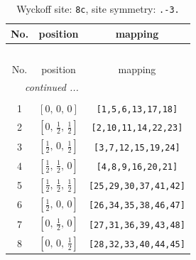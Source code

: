 \documentclass[fleqn,8pt]{jsarticle}
\begin{document}
\begin{longtable}{ccc}
\caption{Wyckoff site: {\tt 8c}, site symmetry: {\tt .-3.}}
 \\
 \hline \hline
No. & position & mapping \\ \hline \endfirsthead

\multicolumn{2}{l}{\tablename\ \thetable{}} \\
 \hline \hline
No. & position & mapping \\ \hline \endhead

 \hline \hline
\multicolumn{2}{r}{\footnotesize\it continued ...} \\ \endfoot

 \hline \hline
\multicolumn{2}{r}{} \\ \endlastfoot

1 & $\left[ 0,\, 0,\, 0 \right]$ & {\tt [1,5,6,13,17,18]} \\ \hline
2 & $\left[ 0,\, \frac{1}{2},\, \frac{1}{2} \right]$ & {\tt [2,10,11,14,22,23]} \\ \hline
3 & $\left[ \frac{1}{2},\, 0,\, \frac{1}{2} \right]$ & {\tt [3,7,12,15,19,24]} \\ \hline
4 & $\left[ \frac{1}{2},\, \frac{1}{2},\, 0 \right]$ & {\tt [4,8,9,16,20,21]} \\ \hline
5 & $\left[ \frac{1}{2},\, \frac{1}{2},\, \frac{1}{2} \right]$ & {\tt [25,29,30,37,41,42]} \\ \hline
6 & $\left[ \frac{1}{2},\, 0,\, 0 \right]$ & {\tt [26,34,35,38,46,47]} \\ \hline
7 & $\left[ 0,\, \frac{1}{2},\, 0 \right]$ & {\tt [27,31,36,39,43,48]} \\ \hline
8 & $\left[ 0,\, 0,\, \frac{1}{2} \right]$ & {\tt [28,32,33,40,44,45]} \\
\end{longtable}
\renewcommand{\arraystretch}{1.2}
\end{document}

